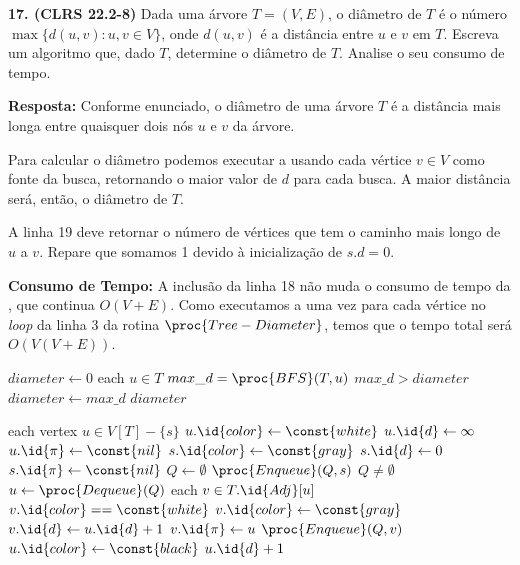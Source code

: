 
\noindent\textbf{17. (CLRS 22.2-8)} Dada uma árvore $T = (V, E)$, o diâmetro de $T$ é o número $\max\{d(u, v) : u, v \in V \}$, onde $d(u, v)$ é a distância entre $u$ e $v$ em $T$. Escreva um algoritmo que, dado $T$, determine o diâmetro de $T$. Analise o seu consumo de tempo.

\textbf{Resposta:} Conforme enunciado, o diâmetro de uma árvore $T$ é a distância mais longa entre quaisquer dois nós $u$ e $v$ da árvore.

Para calcular o diâmetro podemos executar a  usando cada vértice $v \in V$ como fonte da busca, retornando o maior valor de $d$ para cada busca. A maior distância será, então, o diâmetro de $T$.

A linha 19 deve retornar o número de vértices que tem o caminho mais longo de $u$ a $v$. Repare que somamos 1 devido à inicialização de $s.d = 0$.

\textbf{Consumo de Tempo:} A inclusão da linha 18 não muda o consumo de tempo da , que continua $O(V + E)$. Como executamos a  uma vez para cada vértice no \textit{loop} da linha 3 da rotina $\proc{Tree-Diameter}$, temos que o tempo total será $O(V(V + E))$.

\begin{codebox}
\li $diameter \gets 0$
\li \For each $u \in T$
\li \Do
        $max\_d = \proc{BFS}(T, u)$
\li     \If $max\_d > diameter$
\li     \Then 
            $diameter \gets max\_d$
        \End
    \End
\li \Return $diameter$
\end{codebox}

\begin{codebox}
\li \For each vertex $u \in V[T] - \{s\}$
\li \Do
        $u.\id{color} \gets \const{white}$
\li     $u.\id{d} \gets \infty$
\li     $u.\id{\pi} \gets \const{nil}$
    \End
\li $s.\id{color} \gets \const{gray}$
\li $s.\id{d} \gets 0$
\li $s.\id{\pi} \gets \const{nil}$
\li $Q \gets \emptyset$
\li $\proc{Enqueue}(Q, s)$
\li \While $Q \neq \emptyset$
\li \Do
        $u \gets \proc{Dequeue}(Q)$
\li     \For each $v \in T.\id{Adj}[u]$
\li     \Do
            \If $v.\id{color} == \const{white}$
\li         \Then 
                $v.\id{color} \gets \const{gray}$
\li             $v.\id{d} \gets u.\id{d} + 1$
\li             $v.\id{\pi} \gets u$
\li             $\proc{Enqueue}(Q, v)$
            \End
        \End
\li     $u.\id{color} \gets \const{black}$
    \End
\li \Return $u.\id{d} + 1$
\end{codebox}